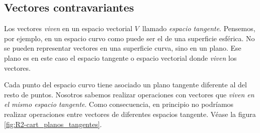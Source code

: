 \subsection{Vectores contravariantes}
Los vectores \emph{viven} en un espacio vectorial $V$\, llamado \emph{espacio tangente}.
Pensemos, por ejemplo, en un espacio curvo como puede ser el de una superficie esférica.
No se pueden representar vectores en una superficie curva, sino en un plano. Ese plano
es en este caso el espacio tangente o espacio vectorial donde \emph{viven} los vectores.

Cada punto  del espacio curvo tiene asociado un plano tangente diferente al del resto
de puntos. Nosotros sabemos realizar operaciones con vectores que
\emph{viven en el mismo espacio tangente}. Como consecuencia, en principio no podríamos
realizar operaciones entre vectores de diferentes espacios tangente\footnotemark{}.
Véase la figura \ref{fig:R2-cart_planos_tangentes}.
